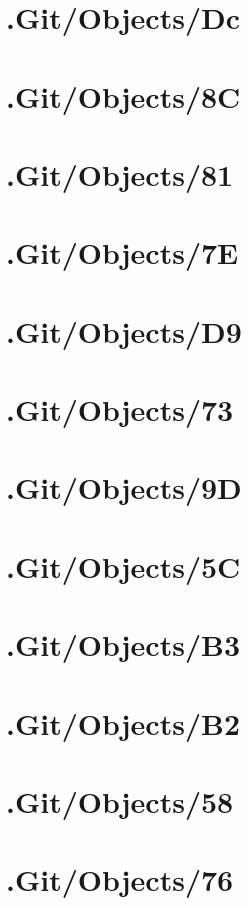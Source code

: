 \section*{.Git/Objects/Dc}

\section*{.Git/Objects/8C}

\section*{.Git/Objects/81}

\section*{.Git/Objects/7E}

\section*{.Git/Objects/D9}

\section*{.Git/Objects/73}

\section*{.Git/Objects/9D}

\section*{.Git/Objects/5C}

\section*{.Git/Objects/B3}

\section*{.Git/Objects/B2}

\section*{.Git/Objects/58}

\section*{.Git/Objects/76}

